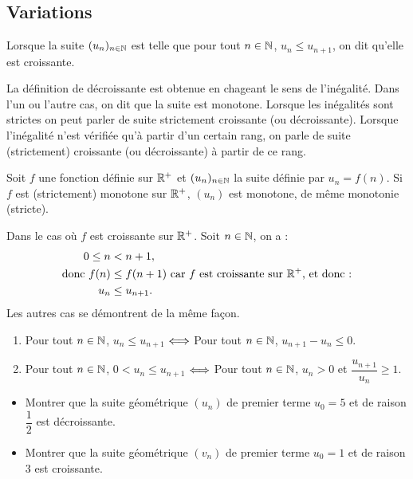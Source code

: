\documentclass[a4paper,11pt,DIV20,BCOR0mm]{scrartcl}
\begin{document}
\subsection{Variations}
\begin{definition}
 Lorsque la suite $(u_n)_{n\in\mathbb{N}}$ est telle que pour tout $n\in\mathbb{N}$, $u_n\leq u_{n+1}$,
on dit qu'elle est croissante.
\end{definition}
La définition de décroissante est obtenue en chageant le sens de l'inégalité. Dans l'un ou l'autre
cas, on dit que la suite est monotone.
Lorsque les inégalités
sont strictes on peut parler de suite strictement croissante (ou décroissante). 
Lorsque l'inégalité n'est vérifiée
qu'à partir d'un certain rang, on parle de suite (strictement) croissante (ou décroissante) à partir 
de ce rang.
\begin{theoreme}
 Soit $f$ une fonction définie sur $\mathbb{R}^+$ et $(u_n)_{n\in\mathbb{N}}$ la suite définie par $u_n=f(n)$.
Si $f$ est (strictement) monotone sur $\mathbb{R}^+$, $(u_n)$ est monotone, de même monotonie (stricte). 
\end{theoreme}
\begin{demonstration}
 Dans le cas o\`u $f$ est croissante sur $\mathbb{R}^+$. Soit $n\in\mathbb{N}$, on a :
\begin{align*}
 0\leq n&<n+1,\\
  \text{donc }f(n)&\leq f(n+1)\text{ car $f$ est croissante sur $\mathbb{R}^+$, et donc :}\\
  u_n&\leq u_{n+1}.
\end{align*}
Les autres cas se démontrent de la même façon.
\end{demonstration}
\begin{theoreme}
\begin{enumerate}
 \item Pour tout $n\in\mathbb{N}$, $u_n\leq u_{n+1}$ $\Longleftrightarrow$ Pour tout $n\in\mathbb{N}$, $u_{n+1}-u_n\leq0$.
 \item Pour tout $n\in\mathbb{N}$, $0<u_n\leq u_{n+1}$ $\Longleftrightarrow$ Pour tout $n\in\mathbb{N}$, $u_n>0$ et $\dfrac{u_{n+1}}{u_n}\geq1$.
\end{enumerate}
\end{theoreme}

\begin{exercice}
 \begin{itemize}
  \item Montrer que la suite géométrique $(u_n)$ de premier terme $u_0=5$ et de raison $\dfrac12$ est
  décroissante.
  \item Montrer que la suite géométrique $(v_n)$ de premier terme $u_0=1$ et de raison $3$ est
  croissante.
 \end{itemize}
\end{exercice}
\end{document}
